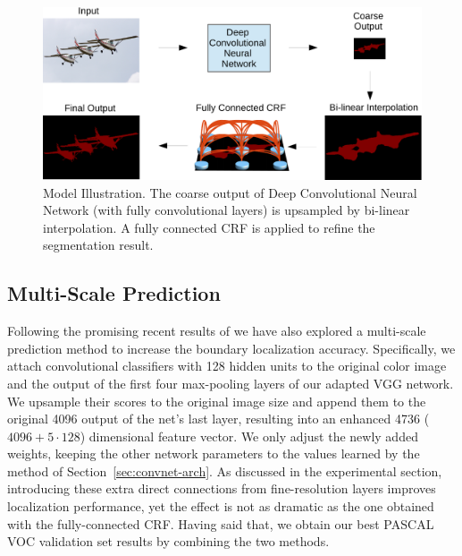 \begin{figure}
  \centering
  \includegraphics[width=1\linewidth]{fig/model_illustration2.pdf}
  \caption{Model Illustration. The coarse output of Deep Convolutional Neural
    Network (with fully convolutional layers) is upsampled by bi-linear
    interpolation. A fully connected CRF is applied to refine the segmentation
    result.}
  \label{fig:ModelIllustration}
\end{figure}

\subsection{Multi-Scale Prediction}
\label{sec:multiscale}

Following the promising recent results of \cite{hariharan2014hypercolumns,
  long2014fully} we have also explored a multi-scale prediction method to
increase the boundary localization accuracy. Specifically, we attach 
convolutional classifiers \cite{lin2013network} with 128 hidden units to the
original color image and the output of the first four max-pooling layers of
our adapted VGG network. We upsample their scores to the original image size
and append them to the original 4096 output of the net's last layer, resulting
into an enhanced 4736 ($4096 + 5 \cdot 128$) dimensional feature vector. We
only adjust the newly added weights, keeping the other network parameters to
the values learned by the method of Section~\ref{sec:convnet-arch}. As
discussed in the experimental section, introducing these extra direct
connections from fine-resolution layers improves localization performance, yet
the effect is not as dramatic as the one obtained with the fully-connected
CRF. Having said that, we obtain our best PASCAL VOC validation set results by
combining the two methods.
